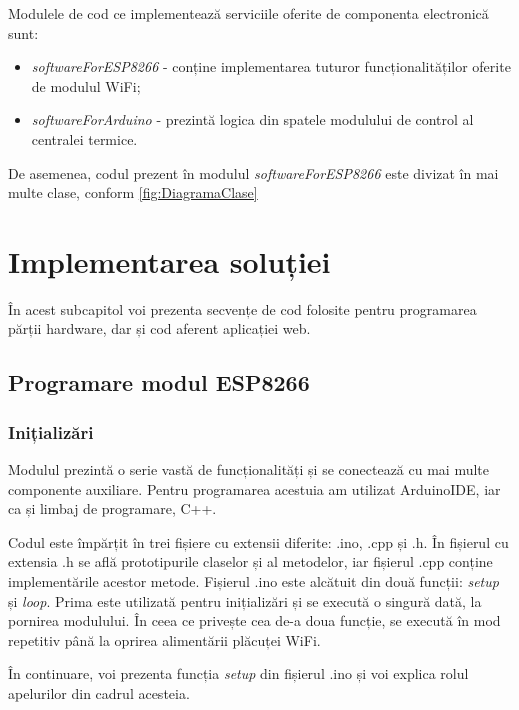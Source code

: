 	Modulele de cod ce implementează serviciile oferite de componenta electronică sunt:
	\begin{itemize}
		\setlength{\itemindent}{2em}
			\itemsep0em
			\item \textit{softwareForESP8266} - conține implementarea tuturor funcționalităților oferite de modulul WiFi;
			\item \textit{softwareForArduino} - prezintă logica din spatele modulului de control al centralei termice.
	\end{itemize}

	De asemenea, codul prezent în modulul \textit{softwareForESP8266} este divizat în mai multe clase, conform \ref{fig:DiagramaClase}

\section{Implementarea soluției}

	În acest subcapitol voi prezenta secvențe de cod folosite pentru programarea părții hardware, dar și cod aferent aplicației web.

\subsection{Programare modul ESP8266}

\subsubsection{Inițializări}

	Modulul prezintă o serie vastă de funcționalități și se conectează cu mai multe componente auxiliare. Pentru programarea acestuia am utilizat ArduinoIDE, iar ca și limbaj de programare, C++. 

	Codul este împărțit în trei fișiere cu extensii diferite: .ino, .cpp și .h. În fișierul cu extensia .h se află prototipurile claselor și al metodelor, iar fișierul .cpp conține implementările acestor metode. Fișierul .ino este alcătuit din două funcții: \textit{setup} și \textit{loop}. Prima este utilizată pentru inițializări și se execută o singură dată, la pornirea modulului. În ceea ce privește cea de-a doua funcție, se execută în mod repetitiv până la oprirea alimentării plăcuței WiFi.

\vspace{1em}

	În continuare, voi prezenta funcția \textit{setup} din fișierul .ino și voi explica rolul apelurilor din cadrul acesteia.

